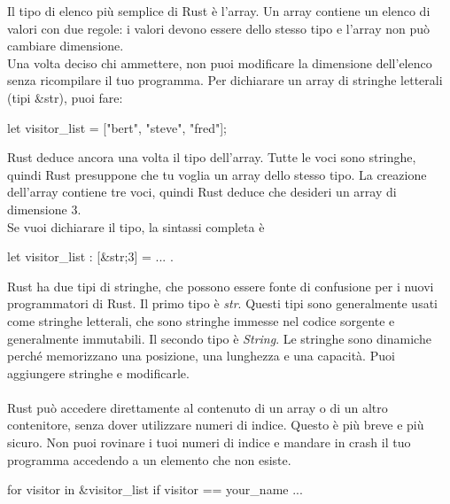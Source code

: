 \documentclass[11pt,a4paper]{article}
\begin{document}
Il tipo di elenco più semplice di Rust è l'array. Un array contiene un elenco di valori con due regole: i valori devono essere dello stesso tipo e l'array non può cambiare dimensione.\\
Una volta deciso chi ammettere, non puoi modificare la dimensione dell'elenco senza ricompilare il tuo programma.
Per dichiarare un array di stringhe letterali (tipi \&str), puoi fare:
\begin{rust}
let visitor_list = ["bert", "steve", "fred"];
\end{rust}
Rust deduce ancora una volta il tipo dell'array. Tutte le voci sono stringhe, quindi Rust presuppone che tu voglia un array dello stesso tipo. La creazione dell'array contiene tre voci, quindi Rust deduce che desideri un array di dimensione 3.\\
Se vuoi dichiarare il tipo, la sintassi completa è 
\begin{rust}
let visitor_list : [&str;3] = ... .
\end{rust}
Rust ha due tipi di stringhe, che possono essere fonte di confusione per i nuovi programmatori di Rust. Il primo tipo è \textit{str}. Questi tipi sono generalmente usati come stringhe letterali, che sono stringhe immesse nel codice sorgente e generalmente immutabili. Il secondo tipo è \textit{String}. Le stringhe sono dinamiche perché memorizzano una posizione, una lunghezza e una capacità. Puoi aggiungere stringhe e modificarle.\\
\\
Rust può accedere direttamente al contenuto di un array o di un altro contenitore, senza dover utilizzare numeri di indice. Questo è più breve e più sicuro. Non puoi rovinare i tuoi numeri di indice e mandare in crash il tuo programma accedendo a un elemento che non esiste.\\
\begin{rust}
for visitor in &visitor_list {
	if visitor == your_name { ... }
}
\end{rust}
\end{document}
